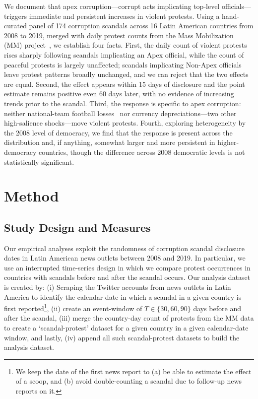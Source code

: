 \documentclass[11pt]{article}
\begin{document}
We document that apex corruption---corrupt acts implicating top-level officials---triggers immediate and persistent increases in violent protests. Using a hand-curated panel of 174 corruption scandals across 16 Latin American countries from 2008 to 2019, merged with daily protest counts from the Mass Mobilization (MM) project~\citep{clark2016mass}, we establish four facts. First, the daily count of violent protests rises sharply following scandals implicating an Apex official, while the count of peaceful protests is largely unaffected; scandals implicating Non-Apex officials leave protest patterns broadly unchanged, and we can reject that the two effects are equal. Second, the effect appears within 15 days of disclosure and the point estimate remains positive even 60 days later, with no evidence of increasing trends prior to the scandal. Third, the response is specific to apex corruption: neither national-team football losses~\citep[see e.g.,][]{DuranteFutbol} nor currency depreciations---two other high-salience shocks---move violent protests. Fourth, exploring heterogeneity by the 2008 level of democracy, we find that the response is present across the distribution and, if anything, somewhat larger and more persistent in higher-democracy countries, though the difference across 2008 democratic levels is not statistically significant.

\section{Method}\label{sec:methods}
\subsection{Study Design and Measures}

Our empirical analyses exploit the randomness of corruption scandal disclosure dates in Latin American news outlets between 2008 and 2019. In particular, we use an interrupted time-series design in which we compare protest occurrences in countries with scandals before and after the scandal occurs. Our analysis dataset is created by: (i) Scraping the Twitter accounts from news outlets in Latin America to identify the calendar date in which a scandal in a given country is first reported\footnote{We keep the date of the first news report to (a) be able to estimate the effect of a scoop, and (b) avoid double-counting a scandal due to follow-up news reports on it.}, (ii) create an event-window of $T \in \{30, 60, 90\}$ days before and after the scandal, (iii) merge the country-day count of protests from the MM data to create a `scandal-protest' dataset for a given country in a given calendar-date window, and lastly, (iv) append all such scandal-protest datasets to build the analysis dataset.
\end{document}
